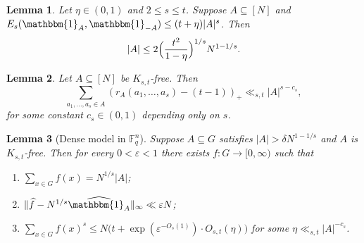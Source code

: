 \documentclass[10pt,a4paper]{amsart}
\newtheorem{lemma}{Lemma}
\newcommand{\F}{\mathbb{F}}
\newcommand{\e}{\mathbbm{1}}          %
\begin{document}
\begin{lemma}\label{lem: upper bound on A} Let $\eta\in(0,1)$  and $2\le s\le t$.
Suppose $A\subseteq [N]$ and $E_s(\e_A,\e_{-A})\leq (t+\eta)|A|^s$. Then
\[
|A|\leq 2\Bigl(\frac{t^2}{1-\eta}\Bigr)^{1/s}N^{1-1/s}.
\]
\end{lemma}

\begin{lemma}\label{lem: vanishing K_st-free}
Let $A\subseteq[N]$ be $K_{s,t}$-free. Then\[
\sum_{a_1,\dots,a_s\in A} (r_A(a_1,\dots,a_s) - (t-1))_+\ll_{s,t}|A|^{s-c_s},
\]
for some constant $c_s\in(0,1)$ depending only on $s$. 
\end{lemma}

\begin{lemma}[Dense model in $\F_q^n$]\label{lem:dense-model-ff}
Suppose $A\subseteq G$ satisfies $|A|>\delta N^{1-1/s}$ and $A$ is $K_{s,t}$-free. 
Then for every $0<\varepsilon<1$ there exists $f:G\to[0,\infty)$ such that
\begin{enumerate}[label=(\roman*)]
\item $\sum_{x\in G} f(x)=N^{1/s}|A|$;
\item $\|\widehat f-N^{1/s}\widehat{\e_A}\|_\infty\ll \varepsilon N$;
\item $\displaystyle \sum_{x\in G} f(x)^s\le N\Big(t+\exp(\varepsilon^{-O_s(1)})\cdot O_{s,t}(\eta)\Big)$ for some $\eta\ll_{s,t}|A|^{-c_s}$.
\end{enumerate}
\end{lemma}
\end{document}
